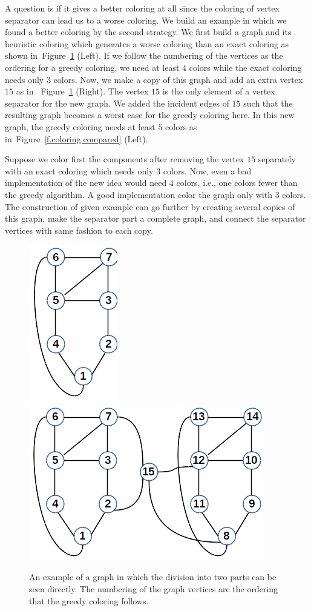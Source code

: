 \documentclass[12pt, twoside,a4paper,toc=bibliography]{scrbook}
\newcommand{\figref}[1]{Figure~\protect\ref{#1}}
\begin{document}
A question is if it gives a better coloring at all since the coloring of vertex separator
can lead us to a worse coloring.
We build an example in which we found a better coloring by the second strategy.
We first build a graph and its heuristic coloring which generates a worse coloring
than an exact coloring as shown in~\figref{f.coloring.graph} (Left). If we follow
the numbering of the vertices as the ordering for a greedy coloring, we need
at least $4$ colors while the exact coloring needs only $3$ colors.
Now, we make a copy of this graph and add an extra vertex $15$ as in
~\figref{f.coloring.graph} (Right). The vertex $15$ is the only element of
a vertex separator for the new graph. We added the incident edges of $15$ such that
the resulting graph becomes a worst case for the greedy coloring here.
In this new graph, the greedy coloring needs at least $5$ colors
as in~\figref{f.coloring.compared} (Left).

Suppose we color first the components after removing the vertex $15$ separately with
an exact coloring which needs only $3$ colors. Now, even a bad implementation of the
new idea would need $4$ colors, i.e., one colors fewer than the greedy algorithm.
A good implementation color the graph only with $3$ colors.
The construction of given example can go further by creating several copies of 
this graph, make the separator part a complete graph, and connect the separator vertices
with same fashion to each copy.
\begin{figure}
\centering
\includegraphics[width=0.18\linewidth]{coloring0}
\hfill
\includegraphics[width=0.48\linewidth]{coloring1}
\caption{
An example of a graph in which the division into two parts can be seen directly.
The numbering of the graph vertices are the ordering that the greedy coloring follows.
}
\label{f.coloring.graph}
\end{figure}
\end{document}
